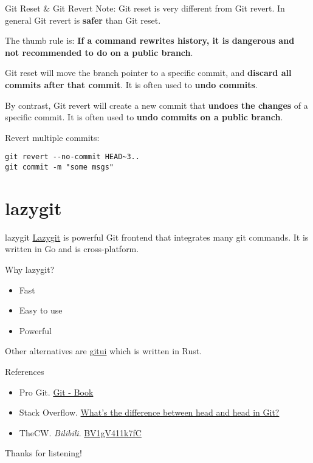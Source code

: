 \documentclass[aspectratio=169]{beamer}
\begin{document}
\begin{frame}[fragile]{Git Reset \& Git Revert}
    Note: Git reset is very different from Git revert.
    In general Git revert is \textbf{safer} than Git reset.

    \pause

    The thumb rule is: \textbf{If a command rewrites history, it is dangerous and not recommended to do on a public branch}.

    \pause

    Git reset will move the branch pointer to a specific commit, and \textbf{discard all commits after that commit}. It is often used to \textbf{undo commits}.

    \pause

    By contrast, Git revert will create a new commit that \textbf{undoes the changes} of a specific commit. It is often used to \textbf{undo commits on a public branch}.

    \pause
    \bigskip

    Revert multiple commits:
    \begin{verbatim}
git revert --no-commit HEAD~3..
git commit -m "some msgs"
    \end{verbatim}
\end{frame}

\section{lazygit}

\begin{frame}{lazygit}
    \href{https://github.com/jesseduffield/lazygit}{Lazygit} is powerful Git frontend that integrates many git commands. It is written in Go and is cross-platform.

    \pause

    Why lazygit?
    \begin{itemize}
        \item Fast
        \item Easy to use
        \item Powerful
    \end{itemize}

    Other alternatives are \href{https://github.com/Extrawurst/gitui}{gitui} which is written in Rust.
\end{frame}

\begin{frame}{References}
    \begin{itemize}
        \item Pro Git. \href{https://git-scm.com/book/en/v2}{Git - Book}
        \item Stack Overflow. \href{https://stackoverflow.com/questions/2221658/whats-the-difference-between-head-and-head-in-git}{What's the difference between head and head in Git?}
        \item TheCW. \emph{Bilibili}. \href{https://www.bilibili.com/video/BV1gV411k7fC}{BV1gV411k7fC}
    \end{itemize}
\end{frame}

\begin{frame}
    \Huge{\textcolor{UMBlue}{Thanks for listening!}}
\end{frame}
\end{document}
